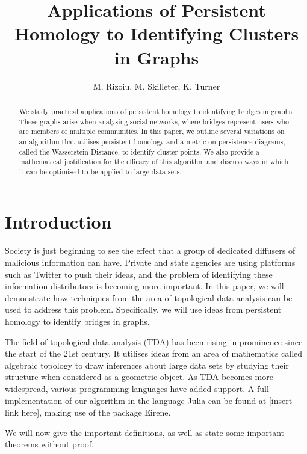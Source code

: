 \documentclass[12pt,a4paper]{amsart}
\numberwithin{equation}{section}
\theoremstyle{plain}
\theoremstyle{definition}
\begin{document}
\title{Applications of Persistent Homology to Identifying Clusters in Graphs }


\author[]{M. Rizoiu, M. Skilleter, K. Turner}

\address{Australian National University \\ Mathematical Sciences Institute} 


\begin{abstract} We study practical applications of persistent homology to identifying bridges in graphs. These graphs arise when analysing social networks, where bridges represent users who are members of multiple communities. In this paper, we outline several variations on an algorithm that utilises persistent homology and a metric on persistence diagrams, called the Wasserstein Distance, to identify cluster points. We also provide a mathematical justification for the efficacy of this algorithm and discuss ways in which it can be optimised to be applied to large data sets.
\end{abstract}

\maketitle

\section{Introduction} Society is just beginning to see the effect that a group of dedicated diffusers of malicious information can have. Private and state agencies are using platforms such as Twitter to push their ideas, and the problem of identifying these information distributors is becoming more important. In this paper, we will demonstrate how techniques from the area of topological data analysis can be used to address this problem. Specifically, we will use ideas from persistent homology to identify bridges in graphs.

The field of topological data analysis (TDA) has been rising in prominence since the start of the 21st century. It utilises ideas from an area of mathematics called algebraic topology to draw inferences about large data sets by studying their structure when considered as a geometric object. As TDA becomes more widespread, various programming languages have added support. A full implementation of our algorithm in the language Julia can be found at [insert link here], making use of the package Eirene.

We will now give the important definitions, as well as state some important theorems without proof.
\end{document}
